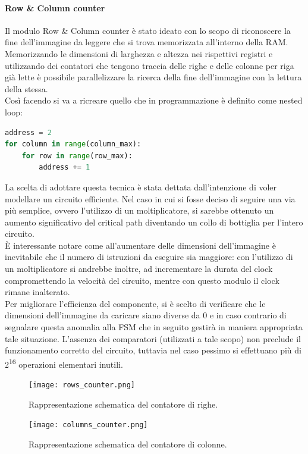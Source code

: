 \paragraph{Row \& Column counter\\}

Il modulo Row \& Column counter è stato ideato con lo scopo di riconoscere la fine dell'immagine da leggere che si trova memorizzata all'interno della RAM.\\
Memorizzando le dimensioni di larghezza e altezza nei rispettivi registri e utilizzando dei contatori che tengono traccia delle righe e delle colonne per riga già lette è possibile parallelizzare la ricerca della fine dell'immagine con la lettura della stessa.\\
Così facendo si va a ricreare quello che in programmazione è definito come nested loop:

\begin{lstlisting}[language=Python, caption={Nested loop in pseudocodice.},captionpos=b]
address = 2
for column in range(column_max):
    for row in range(row_max):
        address += 1
\end{lstlisting}

La scelta di adottare questa tecnica è stata dettata dall'intenzione di voler modellare un circuito efficiente. Nel caso in cui si fosse deciso di seguire una via più semplice, ovvero l'utilizzo di un moltiplicatore, si sarebbe ottenuto un aumento significativo del critical path diventando un collo di bottiglia per l'intero circuito.\\
È interessante notare come all'aumentare delle dimensioni dell'immagine è inevitabile che il numero di istruzioni da eseguire sia maggiore: con l'utilizzo di un moltiplicatore si andrebbe inoltre, ad incrementare la durata del clock compromettendo la velocità del circuito, mentre con questo modulo il clock rimane inalterato.\\
Per migliorare l'efficienza del componente, si è scelto di verificare che le dimensioni dell'immagine da caricare siano diverse da 0 e in caso contrario di segnalare questa anomalia alla FSM che in seguito gestirà in maniera appropriata tale situazione. L'assenza dei comparatori (utilizzati a tale scopo) non preclude il funzionamento corretto del circuito, tuttavia nel caso pessimo si effettuano più di 2\textsuperscript{16} operazioni elementari inutili.

\begin{figure}[h!]
\centering
\texttt{[image: rows\_counter.png]}%
\caption{Rappresentazione schematica del contatore di righe.}
\end{figure}
\begin{figure}[h!]
\centering
\texttt{[image: columns\_counter.png]} %
\caption{Rappresentazione schematica del contatore di colonne.}
\end{figure}

